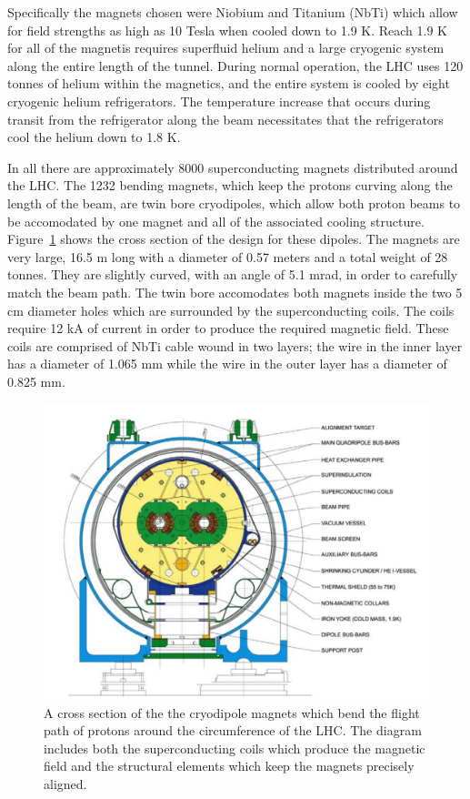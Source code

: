 Specifically the magnets chosen were Niobium and Titanium (NbTi) which allow for field strengths as high as 10 Tesla when cooled down to 1.9 K.
Reach 1.9 K for all of the magnetis requires superfluid helium and a large cryogenic system along the entire length of the tunnel.
During normal operation, the \ac{LHC} uses 120 tonnes of helium within the magnetics, and the entire system is cooled by eight cryogenic helium refrigerators.
The temperature increase that occurs during transit from the refrigerator along the beam necessitates that the refrigerators cool the helium down to 1.8 K.

In all there are approximately 8000 superconducting magnets distributed around the \ac{LHC}.
The 1232 bending magnets, which keep the protons curving along the length of the beam, are twin bore cryodipoles, which allow both proton beams to be accomodated by one magnet and all of the associated cooling structure.
Figure~\ref{fig:dipole_magnet} shows the cross section of the design for these dipoles. 
The magnets are very large, 16.5 m long with a diameter of 0.57 meters and a total weight of 28 tonnes. 
They are slightly curved, with an angle of 5.1 mrad, in order to carefully match the beam path.
The twin bore accomodates both magnets inside the two 5 cm diameter holes which are surrounded by the superconducting coils.
The coils require 12 kA of current in order to produce the required magnetic field.
These coils are comprised of NbTi cable wound in two layers; the wire in the inner layer has a diameter of 1.065 mm while the wire in the outer layer has a diameter of 0.825 mm. 

\begin{figure}
\centering
\includegraphics[width=\fullfig]{figures/dipole_magnet.png}
\caption{A cross section of the the cryodipole magnets which bend the flight path of protons around the circumference of the \ac{LHC}. The diagram includes both the superconducting coils which produce the magnetic field and the structural elements which keep the magnets precisely aligned.}
\label{fig:dipole_magnet}

\end{figure}

